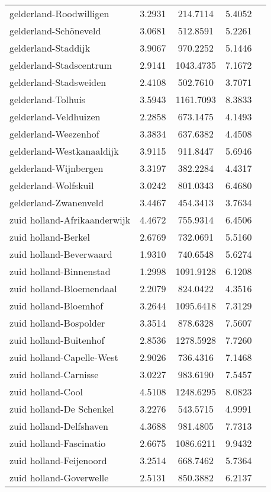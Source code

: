 \begin{longtable}{llccc}
gelderland-Roodwilligen & 3.2931 & 214.7114 & 5.4052 \\
gelderland-Schöneveld & 3.0681 & 512.8591 & 5.2261 \\
gelderland-Staddijk & 3.9067 & 970.2252 & 5.1446 \\
gelderland-Stadscentrum & 2.9141 & 1043.4735 & 7.1672 \\
gelderland-Stadsweiden & 2.4108 & 502.7610 & 3.7071 \\
gelderland-Tolhuis & 3.5943 & 1161.7093 & 8.3833 \\
gelderland-Veldhuizen & 2.2858 & 673.1475 & 4.1493 \\
gelderland-Weezenhof & 3.3834 & 637.6382 & 4.4508 \\
gelderland-Westkanaaldijk & 3.9115 & 911.8447 & 5.6946 \\
gelderland-Wijnbergen & 3.3197 & 382.2284 & 4.4317 \\
gelderland-Wolfskuil & 3.0242 & 801.0343 & 6.4680 \\
gelderland-Zwanenveld & 3.4467 & 454.3413 & 3.7634 \\
zuid holland-Afrikaanderwijk & 4.4672 & 755.9314 & 6.4506 \\
zuid holland-Berkel & 2.6769 & 732.0691 & 5.5160 \\
zuid holland-Beverwaard & 1.9310 & 740.6548 & 5.6274 \\
zuid holland-Binnenstad & 1.2998 & 1091.9128 & 6.1208 \\
zuid holland-Bloemendaal & 2.2079 & 824.0422 & 4.3516 \\
zuid holland-Bloemhof & 3.2644 & 1095.6418 & 7.3129 \\
zuid holland-Bospolder & 3.3514 & 878.6328 & 7.5607 \\
zuid holland-Buitenhof & 2.8536 & 1278.5928 & 7.7260 \\
zuid holland-Capelle-West & 2.9026 & 736.4316 & 7.1468 \\
zuid holland-Carnisse & 3.0227 & 983.6190 & 7.5457 \\
zuid holland-Cool & 4.5108 & 1248.6295 & 8.0823 \\
zuid holland-De Schenkel & 3.2276 & 543.5715 & 4.9991 \\
zuid holland-Delfshaven & 4.3688 & 981.4805 & 7.7313 \\
zuid holland-Fascinatio & 2.6675 & 1086.6211 & 9.9432 \\
zuid holland-Feijenoord & 3.2514 & 668.7462 & 5.7364 \\
zuid holland-Goverwelle & 2.5131 & 850.3882 & 6.2137 \\

\end{longtable}
